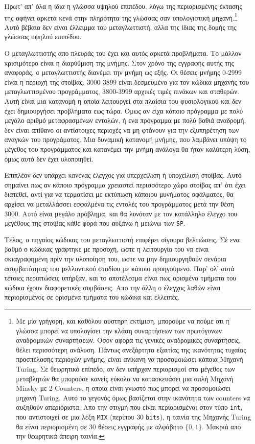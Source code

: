 \documentclass[a4paper,11pt]{article}
\newcommand{\eng}[1]{\foreignlanguage{english}{#1}}
\newcommand{\tech}[1]{\foreignlanguage{english}{\texttt{#1}}}
\begin{document}
Πρωτ' απ' όλα η ίδια η γλώσσα υψηλού επιπέδου, λόγω της περιορισμένης έκτασης της αφήνει
αρκετά κενά στην πληρότητα της γλώσσας σαν υπολογιστική μηχανή.\footnote{
	Με μία γρήγορη, και καθόλου αυστηρή εκτίμιση, μπορούμε να πούμε οτι η γλώσσα μπορεί
	να υπολογίσει την κλάση συναρτήσεων των πρωτόγονων αναδρομικών συναρτήσεων. Όσον 
	αφορά τις γενικές αναδρομικές συναρτήσεις, θέλει περισσότερη ανάλυση. Πάντως ανεξάρτητα
	εξαιτίας της ικανότητας τυχαίας προσπέλασης περιοχών μνήμης, είναι ανίκανη να προσομοιώσει
	κάποια Μηχανή \eng{Turing}. Σε θεωρητικό επίπεδο, αν δεν υπήρχαν περιορισμοί στο μέγεθος
	των μεταβλητών θα μπορούσε κανείς εύκολα να κατασκευάσει μια απλή Μηχανή \eng{Minsky} με 
	2 \eng{Counters}, η οποία είναι γνωστό πως μπορεί να προσομοιώσει μηχανή \eng{Turing}.
	Αυτό το γεγονός όμως βασίζεται στην ικανότητα των \eng{counters} να αυξηθούν απεριόριστα.
	Απο την στιγμή που είναι περιορισμένοι στον τύπο \tech{int}, που αντιστοιχεί σε μια
	λέξη \tech{MIX} (περίπου \(30\) \tech{bits}), η ταινία της Μηχανής \eng{Turing} θα είναι
	περιορισμένη σε \(30\) θέσεις εγγραφής με αλφάβητο \(\{0,1\}\). Μακριά απο την θεωρητικά
	άπειρη ταινία.
} Αυτό βέβαια δεν είναι έλλειμμα του μεταγλωττιστή, αλλα της ίδιας της δομής της γλώσσας 
υψηλού επιπέδου.

Ο μεταγλωττιστής απο πλευράς του έχει και αυτός αρκετά προβλήματα. Το μάλλον κρισιμότερο
είναι η διαρύθμιση της μνήμης. Στον χρόνο της εγγραφής αυτής της αναφοράς, ο μεταγλωττιστής
διανέμει την μνήμη ως εξής. Οι θέσεις μνήμης 0-2999 είναι η περιοχή της στοίβας, 3000-3899
είναι δεσμευμένο για τον κώδικα μηχανής του μεταγλωττισμένου προγράμματος, 3800-3999 
αρχικές τιμές πινάκων και σταθερών. Αυτή είναι μια κατανομή η οποία λειτουργεί στα πλαίσια
του φυσιολογικού και δεν έχει δημιουργήσει προβλήματα εως τώρα. Όμως αν είχα κάποιο πρόγραμμα
με πολύ μεγάλο αριθμό μεταφρασμένων εντολών, ή ενα πρόγραμμα με πολύ βαθιά αναδρομή, δεν είναι
απίθανο οι αντίστοιχες περιοχές να μη φτάνουν για την εξυπηρέτηση των αναγκών του προγράματος.
Μια δυναμική κατανομή μνήμης, που λαμβάνει υπόψη το μέγεθος του προγράμματος και κατανέμει
την μνήμη ανάλογα θα ήταν καλύτερη λύση, όμως αυτό δεν έχει υλοποιηθεί.

Επιπλέον δεν υπάρχει κανένας έλεγχος για υπερχείλιση ή υποχείλιση στοίβας. Αυτό σημαίνει
πως αν κάποιο πρόγραμμα χρειαστεί περισσότερο χώρο στοίβας απ' ότι έχει διατεθεί, αντί για
να τερματίσει με εκτύπωση κάποιου μυνήματος σφάλματος, θα αρχίσει να μεταλλάσσει εσφαλμένα 
τις εντολές του προγράμματος μετά την θέση 3000. Αυτό είναι μεγάλο πρόβλημα, και θα λυνόταν
με τον κατάλληλο έλεγχο του μεγέθους της στοίβας κάθε φορά που αυξάνω ή μειώνω των \tech{SP}.

Τέλος, ο πηγαίος κώδικας του μεταγλωττιστή επιφέρει σίγουρα βελτιώσεις. Σέ ενα βαθμό
ο κώδικας γράφτηκε με προσοχή, ωστε η λειτουργία του να είναι σκιαγραφημένη πρίν την 
υλοποίηση του, ωστε να μην δημιουργηθούν σενάρια ασυμβατότητας του μελλοντικού σταδίου
με κάποιο προηγούμενο. Παρ' ολ' αυτά τέτοιες περιπτώσεις υπήρξαν, και το αποτέλεσμα
είναι πως ορισμένα τμήματα του κώδικα έχουν διαφορετικές συμβάσεις. Απο την άλλη ο έλεγχος
λαθών είναι περιορισμένος σε ορισμένα τμήματα του κώδικα και ελλειπές. 
\end{document}
